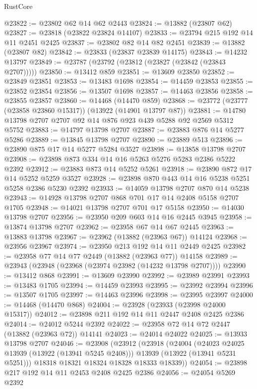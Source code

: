 \begin{lexlean}{RustCore}
\begin{coremodule}
@23822 := @23802 @62 @14 @62 @2443
@23824 := @13882 (@23807 @62)
@23827 := @23818 (@23822 @23824 @14107)
@23833 := @23794 @215 @192 @14 @11 @2451 @2425
@23837 := @23802 @82 @14 @82 @2451
@23839 := @13882 (@23807 @82)
@23842 := @23833 (@23837 @23839 @14175)
@23843 := @14232 @13797
@23849 := @23787 (@23792 (@23812 (@23827 (@23842 (@23843 @2707)))))
@23850 := @13412 @859
@23851 := @13609 @23850
@23852 := @23849 @23851
@23853 := @13483 @1698
@23854 := @14459 @23853
@23855 := @23852 @23854
@23856 := @13507 @1698
@23857 := @14463 @23856
@23858 := @23855 @23857
@23860 := @14468 (@14470 @859)
@23868 := @23772 (@23777 (@23858 @23860 @15317)) (@13922 (@14901 @13797 @87))
@23881 := @14780 @13798 @2707 @2707 @92 @14 @876 @923 @439 @5288 @92 @2569 @5312 @5752
@23883 := @14797 @13798 @2707
@23887 := @23883 @876 @14 @5277 @5286
@23889 := @13845 @13798 @2707
@23890 := @23889 @513
@23896 := @23890 @875 @17 @14 @5277 @5284 @3527
@23898 := @13858 @13798 @2707
@23908 := @23898 @873 @334 @14 @16 @5263 @5276 @5283 @2386 @5222 @2392
@23912 := @23883 @873 @14 @5252 @5261
@23918 := @23890 @872 @17 @14 @5252 @5259 @3527
@23928 := @23898 @870 @443 @14 @16 @5238 @5251 @5258 @2386 @5230 @2392
@23933 := @14059 @13798 @2707 @870 @14 @5238
@23943 := @14928 @13798 @2707 @868 @701 @17 @14 @2408 @5158 @2707 @1705
@23948 := @14021 @13798 @2707 @701 @17 @5158
@23950 := @14030 @13798 @2707
@23956 := @23950 @209 @603 @14 @16 @2445 @3945
@23958 := @13874 @13798 @2707
@23962 := @23958 @67 @14 @67 @2445
@23963 := @13883 @13798
@23967 := @23962 (@13882 (@23963 @67)) @14124
@23968 := @23956 @23967
@23974 := @23950 @213 @192 @14 @11 @2449 @2425
@23982 := @23958 @77 @14 @77 @2449 (@13882 (@23963 @77)) @14158
@23989 := @23943 (@23948 (@23968 (@23974 @23982 (@14232 @13798 @2707))))
@23990 := @13412 @868
@23991 := @13609 @23990
@23992 := @23989 @23991
@23993 := @13483 @1705
@23994 := @14459 @23993
@23995 := @23992 @23994
@23996 := @13507 @1705
@23997 := @14463 @23996
@23998 := @23995 @23997
@24000 := @14468 (@14470 @868)
@24004 := @23928 (@23933 (@23998 @24000 @15317))
@24012 := @23898 @211 @192 @14 @11 @2447 @2408 @2425 @2386
@24014 := @24012 @5244 @2392
@24022 := @23958 @72 @14 @72 @2447 (@13882 (@23963 @72)) @14141
@24023 := @24014 @24022
@24025 := @13933 @13798 @2707
@24046 := @23908
    (@23912
      (@23918
        (@24004
          (@24023 @24025 @13939 (@13922 (@13941 @5245 @2408)))
          @13939
          (@13922 (@13941 @5231 @5251)))
        @18318
        @18321
        @18324
        @18328
        @18333
        @18339))
@24054 := @23898 @217 @192 @14 @11 @2453 @2408 @2425 @2386
@24056 := @24054 @5269 @2392

\end{coremodule}
\end{lexlean}
